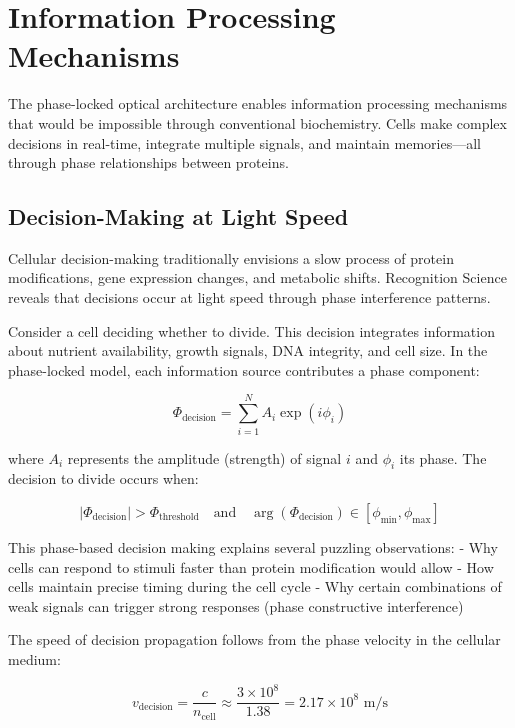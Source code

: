 \documentclass[12pt,a4paper]{report}
\begin{document}
\section{Information Processing Mechanisms}

The phase-locked optical architecture enables information processing mechanisms that would be impossible through conventional biochemistry. Cells make complex decisions in real-time, integrate multiple signals, and maintain memories—all through phase relationships between proteins.

\subsection{Decision-Making at Light Speed}

Cellular decision-making traditionally envisions a slow process of protein modifications, gene expression changes, and metabolic shifts. Recognition Science reveals that decisions occur at light speed through phase interference patterns.

Consider a cell deciding whether to divide. This decision integrates information about nutrient availability, growth signals, DNA integrity, and cell size. In the phase-locked model, each information source contributes a phase component:

\begin{equation}
\Phi_{\text{decision}} = \sum_{i=1}^{N} A_i \exp(i\phi_i)
\end{equation}

where $A_i$ represents the amplitude (strength) of signal $i$ and $\phi_i$ its phase. The decision to divide occurs when:

\begin{equation}
|\Phi_{\text{decision}}| > \Phi_{\text{threshold}} \quad \text{and} \quad \arg(\Phi_{\text{decision}}) \in [\phi_{\text{min}}, \phi_{\text{max}}]
\end{equation}

This phase-based decision making explains several puzzling observations:
- Why cells can respond to stimuli faster than protein modification would allow
- How cells maintain precise timing during the cell cycle
- Why certain combinations of weak signals can trigger strong responses (phase constructive interference)

The speed of decision propagation follows from the phase velocity in the cellular medium:

\begin{equation}
v_{\text{decision}} = \frac{c}{n_{\text{cell}}} \approx \frac{3 \times 10^8}{1.38} = 2.17 \times 10^8 \text{ m/s}
\end{equation}
\end{document}
